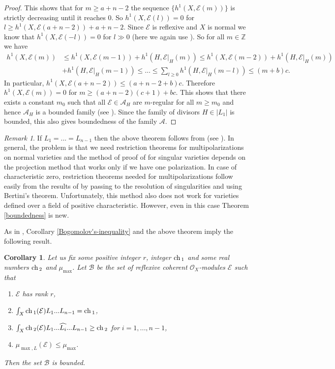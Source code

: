 \documentclass[12pt]{article}
\theoremstyle{plain}
\newtheorem{Corollary}[Thm]{\sc Corollary}
\theoremstyle{definition}
\theoremstyle{remark}
\newtheorem{Remark}[Thm]{Remark}
\newcommand{\ZZ}{{\mathbb Z}}
\newcommand{\cA}{{\mathcal A}}
\newcommand{\cB}{{\mathcal B}}
\newcommand{\cE}{{\mathcal E}}
\newcommand{\cO}{{\mathcal O}}
\newcommand{\ch}{{\mathop{\rm ch \, }}}
\begin{document}
\begin{proof}
This shows that for  $m\ge a+n-2$ the sequence $\{h^1 (X, \cE (m)) \}$ is strictly decreasing until it reaches $0$. So $h^1 (X, \cE (l))=0$ for $l\ge h^1 (X, \cE (a+n-2))+a+n-2$. 
Since $\cE$ is reflexive and $X$ is normal we know that $h^1 (X, \cE (-l))=0$ for $l\gg 0$ (here we again use \cite[Lemma 0FD8]{SP}). So for all $m\in \ZZ$ we have
\begin{align*}
h^1 (X, \cE (m))&\le h^1 (X, \cE (m-1))+ h^1 (H, \cE |_H(m))\le h^1 (X, \cE (m-2))+ h^1 (H, \cE |_H(m))\\
&+ h^1 (H, \cE |_H(m-1))\le ...\le \sum _{l\ge 0} h^1 (H, \cE |_H(m-l))\le 	(m+b)c.
\end{align*}
In particular,  $h^1 (X, \cE (a+n-2))\le (a+n-2+b)c$. Therefore $h^1 (X, \cE (m))=0$ for 
$m\ge (a+n-2)(c+1)+bc$. This shows that there exists a constant $m_0$ such that all $\cE\in \cA_H$ are $m$-regular for all $m\ge m_0$ and hence $\cA_H$ is a bounded family (see \cite[Lemma 1.7.6]{HL}). Since the family of divisors $H\in |L_1|$ is bounded, this also gives boundedness of the family $\cA$.
\end{proof}

\begin{Remark}
If $L_1=...=L_{n-1}$ then the above theorem follows from \cite[Theorem 4.4]{La1}  (see \cite[Theorem 6.4]{La-Chern}).  In general, the problem is that we need restriction theorems for multipolarizations on normal varieties and the method of proof of   \cite[Theorem 4.4]{La1} for singular varieties depends on the projection method that works only if we have one polarization. In case of characteristic zero, restriction theorems needed for multipolarizations follow easily from the results of \cite{La1} by passing to the resolution of singularities and using Bertini's theorem. Unfortunately, this method also does not work for varieties defined over a field of positive characteristic. However, even in this case Theorem \ref{boundedness} is new.
\end{Remark}



As in \cite[Corollary 6.7]{La-Chern}, Corollary \ref{Bogomolov's-inequality} and the above theorem imply the following result. 

\begin{Corollary} \label{boundedness2}
Let us fix some positive integer $r$, integer $\ch_1$ and some real
numbers $\ch _2$ and $\mu _{\max}$. 
Let $\cB$ be the set of reflexive coherent $\cO_X$-modules $\cE$ such that 
\begin{enumerate}
\item $\cE$ has  rank $r$, 
\item  $\int _X \ch_1 (\cE) L_1...L_{n-1}=\ch_1$,
\item $\int _X \ch_2 (\cE) L_1...\widehat{L_i}...L_{n-1} \ge \ch_2$ for $i=1,...,n-1$,
\item $\mu _{\max ,L } (\cE)\le \mu _{\max}$.
\end{enumerate}
Then the set $\cB$ is bounded.
\end{Corollary}
\end{document}
